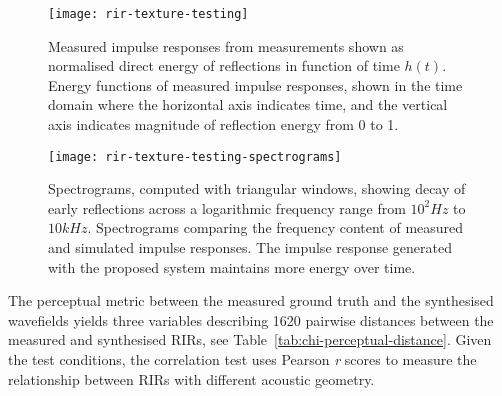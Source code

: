 \begin{figure}[htbp]%
    \centering
    \texttt{[image: rir-texture-testing]}%
    \caption[Texture-based system testing IR results --- time domain]{Measured impulse responses from measurements shown as normalised direct energy of reflections in function of time $h(t)$.  Energy functions of measured impulse responses, shown in the time domain where the horizontal axis indicates time, and the vertical axis indicates magnitude of reflection energy from 0 to 1.}%
    \label{fig:texture-testing-rirs}%
\end{figure}%

\begin{figure}[htbp]%
    \centering
    \texttt{[image: rir-texture-testing-spectrograms]}%
    \caption[Texture-based system testing IR results --- frequency domain]{Spectrograms, computed with triangular windows, showing decay of early reflections across a logarithmic frequency range from $10^2Hz$ to $10kHz$. 
        Spectrograms comparing the frequency content of measured and simulated impulse responses. The impulse response generated with the proposed system maintains more energy over time.}%
    \label{fig:texture-testing-spectograms}%
\end{figure}%


The perceptual metric between the measured ground truth and the synthesised wavefields yields three variables describing 1620 pairwise distances between the measured and synthesised RIRs, see Table~\ref{tab:chi-perceptual-distance}. Given the test conditions, the correlation test uses Pearson \textit{r} scores to measure the relationship between RIRs with different acoustic geometry.



